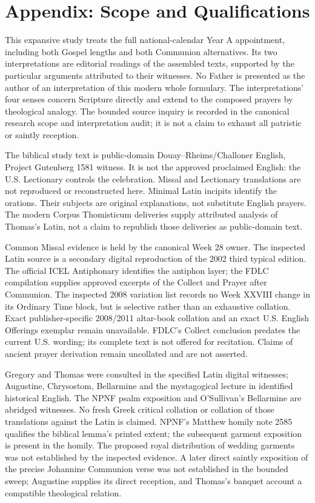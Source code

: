 \section{Appendix: Scope and Qualifications}
This expansive study treats the full national-calendar Year A appointment, including both Gospel lengths and both Communion alternatives. Its two interpretations are editorial readings of the assembled texts, supported by the particular arguments attributed to their witnesses. No Father is presented as the author of an interpretation of this modern whole formulary. The interpretations' four senses concern Scripture directly and extend to the composed prayers by theological analogy. The bounded source inquiry is recorded in the canonical research scope and interpretation audit; it is not a claim to exhaust all patristic or saintly reception.

The biblical study text is public-domain Douay--Rheims/Challoner English, Project Gutenberg 1581 witness. It is not the approved proclaimed English: the U.S. Lectionary controls the celebration. Missal and Lectionary translations are not reproduced or reconstructed here. Minimal Latin incipits identify the orations. Their subjects are original explanations, not substitute English prayers. The modern Corpus Thomisticum deliveries supply attributed analysis of Thomas's Latin, not a claim to republish those deliveries as public-domain text.

Common Missal evidence is held by the canonical Week 28 owner. The inspected Latin source is a secondary digital reproduction of the 2002 third typical edition. The official ICEL Antiphonary identifies the antiphon layer; the FDLC compilation supplies approved excerpts of the Collect and Prayer after Communion. The inspected 2008  variation list records no Week XXVIII change in its Ordinary Time block, but is selective rather than an exhaustive collation. Exact publisher-specific 2008/2011 altar-book collation and an exact U.S. English Offerings exemplar remain unavailable. FDLC's Collect conclusion predates the current U.S. wording; its complete text is not offered for recitation. Claims of ancient prayer derivation remain uncollated and are not asserted.

Gregory and Thomas were consulted in the specified Latin digital witnesses; Augustine, Chrysostom, Bellarmine and the mystagogical lecture in identified historical English. The NPNF psalm exposition and O'Sullivan's Bellarmine are abridged witnesses. No fresh Greek critical collation or collation of those translations against the Latin is claimed. NPNF's Matthew homily note 2585 qualifies the biblical lemma's printed extent; the subsequent garment exposition is present in the homily. The proposed royal distribution of wedding garments was not established by the inspected evidence. A later direct saintly exposition of the precise Johannine Communion verse was not established in the bounded sweep; Augustine supplies its direct reception, and Thomas's banquet account a compatible theological relation.

